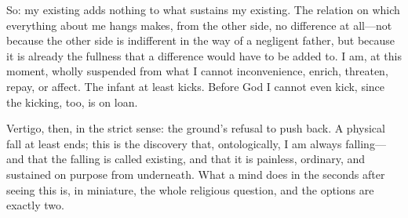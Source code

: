 So: my existing adds nothing to what sustains my existing. The relation on which everything about me hangs makes, from the other side, no difference at all---not because the other side is indifferent in the way of a negligent father, but because it is already the fullness that a difference would have to be added to. I am, at this moment, wholly suspended from what I cannot inconvenience, enrich, threaten, repay, or affect. The infant at least kicks. Before God I cannot even kick, since the kicking, too, is on loan.

Vertigo, then, in the strict sense: the ground's refusal to push back. A physical fall at least ends; this is the discovery that, ontologically, I am always falling---and that the falling is called existing, and that it is painless, ordinary, and sustained on purpose from underneath. What a mind does in the seconds after seeing this is, in miniature, the whole religious question, and the options are exactly two.
